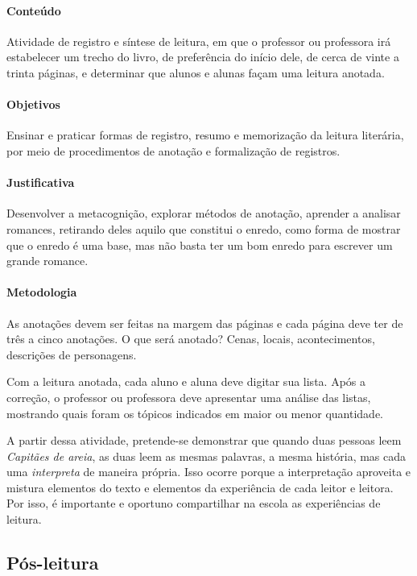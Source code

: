 \documentclass[12pt]{extarticle}
\begin{document}
\paragraph{Conteúdo} Atividade de registro e síntese de leitura, em que
o professor ou professora irá estabelecer um trecho do
livro, de preferência do início dele, de cerca de vinte a trinta
páginas, e determinar que alunos e alunas façam uma leitura anotada.


\paragraph{Objetivos}
Ensinar e praticar formas de registro, resumo e memorização da leitura
literária, por meio de procedimentos de anotação e formalização de
registros.

\paragraph{Justificativa}
Desenvolver a metacognição, explorar métodos de anotação, aprender a
analisar romances, retirando deles aquilo que constitui o enredo, como
forma de mostrar que o enredo é uma base, mas não basta ter um bom
enredo para escrever um grande romance.

\paragraph{Metodologia}
As anotações devem ser feitas na margem das páginas e cada página deve
ter de três a cinco anotações. O que será anotado? Cenas, locais,
acontecimentos, descrições de personagens.

Com a leitura anotada, cada aluno e aluna deve digitar sua lista. Após a correção, o professor ou professora deve apresentar uma análise
das listas, mostrando quais foram os tópicos indicados em maior ou menor quantidade.

A partir dessa atividade, pretende-se demonstrar que quando duas pessoas leem
\emph{Capitães de areia}, as duas leem as mesmas palavras, a mesma
história, mas cada uma \emph{interpreta} de maneira própria. Isso ocorre
porque a interpretação aproveita e mistura elementos do texto e
elementos da experiência de cada leitor e leitora. Por isso, é importante e oportuno compartilhar na escola as experiências
de leitura.

\subsection{Pós-leitura}
\end{document}
